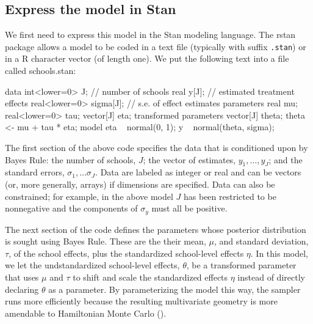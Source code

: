 \documentclass[12pt]{article}
\newcommand{\R}{R\xspace}
\newcommand{\Stan}{Stan\xspace}
\newcommand{\code}[1]{{\tt #1}}
\newcommand{\strong}[1]{\texorpdfstring%
          {{\normalfont\fontseries{b}\selectfont #1}}%
            {#1}}
\let\pkg=\strong
\begin{document}
              \subsection{Express the model in Stan}
              
              We first need to express this model in the \Stan modeling language. The \pkg{rstan} 
              package allows a model to be coded in a text file (typically with suffix \code{.stan}) 
              or in a \R character vector (of length one). 
              We put the following text into a file called schools.stan: 
                \begin{Schunk}
              \begin{Sinput}
              data {
                int<lower=0> J; // number of schools 
                real y[J];      // estimated treatment effects
                real<lower=0> sigma[J]; // s.e. of effect estimates 
              }
              parameters {
                real mu; 
                real<lower=0> tau;
                vector[J] eta;
              }
              transformed parameters {
                vector[J] theta;
                theta <- mu + tau * eta;
              }
              model {
                eta ~ normal(0, 1);
                y ~ normal(theta, sigma);
              }
              \end{Sinput}
              \end{Schunk}
              
              The first section of the above code specifies the data that is conditioned upon by
              Bayes Rule:  the number of schools, $J$; the vector of estimates, $y_1,\dots,y_J$; and 
              the standard errors, $\sigma_{1},\dots\sigma_{J}$.  Data are labeled as integer or real and
              can be vectors (or, more generally, arrays) if dimensions are specified.  Data
              can also be constrained; for example, in the above model $J$ has been
              restricted to be nonnegative and the components of $\sigma_y$ must all be positive.
              
              The next section of the code defines the parameters whose posterior distribution is sought
              using Bayes Rule. These are the their mean, $\mu$, and standard deviation, $\tau$, of the 
              school effects, plus the standardized school-level effects $\eta$. In this model, we let
              the undstandardized school-level effects, $\theta$, be a transformed parameter that uses
              $\mu$ and $\tau$ to shift and scale the standardized effects $\eta$ instead of
              directly declaring $\theta$ as a parameter. By parameterizing the model this way, the
              sampler runs more efficiently because the resulting multivariate geometry is more amendable
              to Hamiltonian Monte Carlo (\citealt{Neal:2011}).
              
\end{document}
